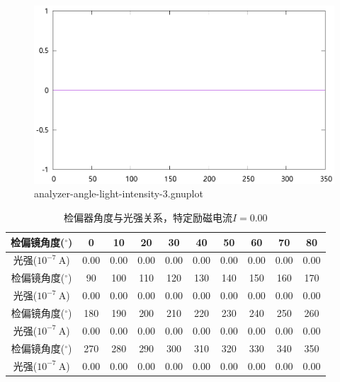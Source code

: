 \documentclass{ctexart}
\newcommand{\si}[1]{\  \mathrm{#1}}
\begin{document}
    \begin{figure}[H]
      \centering
      \includegraphics[width=\linewidth]{../output/analyzer-angle-light-intensity-3.gnuplot}
      \caption{analyzer-angle-light-intensity-3.gnuplot}
      \label{fig:analyzer-angle-light-intensity-3.gnuplot}
    \end{figure}
    \begin{table}[H]
      \centering
      \begin{tabular}{|c|c|c|c|c|c|c|c|c|c|}
        \hline
        检偏镜角度(${}^{\circ}$) & 0 & 10 & 20 & 30 & 40 & 50 & 60 & 70 & 80 \\\hline
        光强($10^{-7} \si{A}$)  & 0.00 & 0.00 & 0.00 & 0.00 & 0.00 & 0.00 & 0.00 & 0.00 & 0.00 \\\hline
        检偏镜角度(${}^{\circ}$) & 90 & 100 & 110 & 120 & 130 & 140 & 150 & 160 & 170 \\\hline
        光强($10^{-7} \si{A}$)  & 0.00 & 0.00 & 0.00 & 0.00 & 0.00 & 0.00 & 0.00 & 0.00 & 0.00  \\\hline
        检偏镜角度(${}^{\circ}$) & 180 & 190 & 200 & 210 & 220 & 230 & 240 & 250 & 260  \\\hline
        光强($10^{-7} \si{A}$)  & 0.00 & 0.00 & 0.00 & 0.00 & 0.00 & 0.00 & 0.00 & 0.00 & 0.00 \\\hline
        检偏镜角度(${}^{\circ}$) & 270 & 280 & 290 & 300 & 310 & 320 & 330 & 340 & 350 \\\hline
        光强($10^{-7} \si{A}$)  & 0.00 & 0.00 & 0.00 & 0.00 & 0.00 & 0.00 & 0.00 & 0.00 & 0.00 \\\hline
      \end{tabular}
      \caption{检偏器角度与光强关系，特定励磁电流$I=0.00$}
    \end{table}
\end{document}
